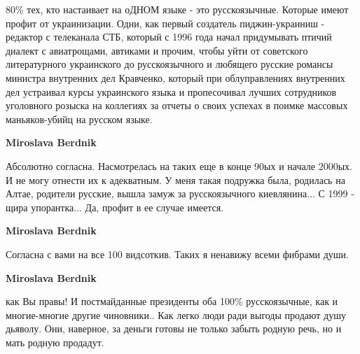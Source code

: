 \begin{itemize}
\begin{itemize}
80\% тех, кто настаивает на оДНОМ языке - это русскоязычные. Которые имеют
профит от украинизации. Одни, как первый создатель пиджин-украиниш - редактор с
телеканала СТБ, который с 1996 года начал придумывать птичий диалект с
авиатрощами, автиками и прочим, чтобы уйти от советского литературного
украинского до русскоязычного и любящего русские романсы министра внутренних
дел Кравченко, который при облуправлениях внутренних дел устраивал курсы
украинского языка и пропесочивал лучших сотрудников уголовного розыска на
коллегиях за отчеты о своих успехах в поимке массовых маньяков-убийц на русском
языке.

 
\textbf{Miroslava Berdnik} 

Абсолютно согласна. Насмотрелась на таких еще в конце 90ых и начале 2000ых. И
не могу отнести их к адекватным. У меня такая подружка была, родилась на Алтае,
родители русские, вышла замуж за русскоязычного киевлянина... С 1999 - щира
упорантка... Да, профит в ее случае имеется.


 
\textbf{Miroslava Berdnik} 

Согласна с вами на все 100 видсоткив. Таких я ненавижу всеми фибрами души.


 
\textbf{Miroslava Berdnik} 

как Вы правы! И постмайданные президенты оба 100\% русскоязычные, как и
многие-многие другие чиновники.. Как легко люди ради выгоды продают душу
дьяволу. Они, наверное, за деньги готовы не только забыть родную речь, но и
мать родную продадут.

 

\end{itemize}
\end{itemize}
